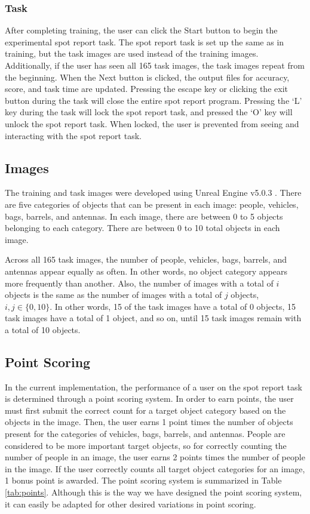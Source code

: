 \documentclass[preprint,12pt, a4paper]{elsarticle}
\begin{document}
\subsubsection{Task}
After completing training, the user can click the Start button to begin the experimental spot report task. The spot report task is set up the same as in training, but the task images are used instead of the training images. Additionally, if the user has seen all 165 task images, the task images repeat from the beginning. When the Next button is clicked, the output files for accuracy, score, and task time are updated. Pressing the escape key or clicking the exit button during the task will close the entire spot report program. Pressing the `L' key during the task will lock the spot report task, and pressed the `O' key will unlock the spot report task. When locked, the user is prevented from seeing and interacting with the spot report task. 


\subsection{Images}
The training and task images were developed using Unreal Engine v5.0.3 {\cite{7836249}}. There are five categories of objects that can be present in each image: people, vehicles, bags, barrels, and antennas. In each image, there are between 0 to 5 objects belonging to each category. There are between 0 to 10 total objects in each image. \vspace{2mm}

Across all 165 task images, the number of people, vehicles, bags, barrels, and antennas appear equally as often. In other words, no object category appears more frequently than another. Also, the number of images with a total of $i$ objects is the same as the number of images with a total of $j$ objects, $i,j \in \{0,10\}$. In other words, 15 of the task images have a total of 0 objects, 15 task images have a total of 1 object, and so on, until 15 task images remain with a total of 10 objects.


\subsection{Point Scoring}
In the current implementation, the performance of a user on the spot report task is determined through a point scoring system. In order to earn points, the user must first submit the correct count for a target object category based on the objects in the image. Then, the user earns 1 point times the number of objects present for the categories of vehicles, bags, barrels, and antennas. People are considered to be more important target objects, so for correctly counting the number of people in an image, the user earns 2 points times the number of people in the image. If the user correctly counts all target object categories for an image, 1 bonus point is awarded. The point scoring system is summarized in Table \ref{tab:points}. Although this is the way we have designed the point scoring system, it can easily be adapted for other desired variations in point scoring.
\end{document}
